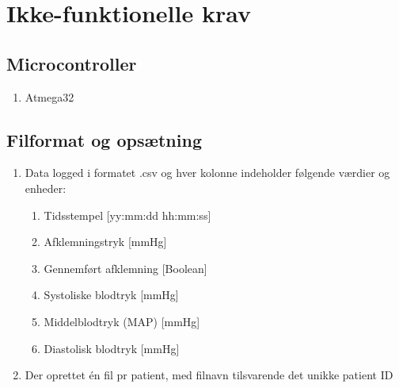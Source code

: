{	%
	
	\pagebreak
	
%	
	
	
	
	
	
	
	
	
	
	
	
	
	
	
	
	\section{Ikke-funktionelle krav }
	
	\subsection{Microcontroller}
	\begin{enumerate}
		\setlength\itemsep{0cm}
		\item Atmega32
		\end{enumerate}
	
	\subsection{Filformat og opsætning}
	\begin{enumerate}
		\setlength\itemsep{0cm} %
		\item Data logged i formatet .csv og hver kolonne indeholder følgende værdier og enheder: 
		\begin{enumerate}
			\item Tidsstempel [yy:mm:dd hh:mm:ss]
			\item Afklemningstryk [mmHg]
			\item Gennemført afklemning [Boolean]
			\item Systoliske blodtryk [mmHg]
			\item Middelblodtryk (MAP) [mmHg]
			\item Diastolisk blodtryk [mmHg]
		\end{enumerate}
		\item Der oprettet én fil pr patient, med filnavn tilsvarende det unikke patient ID
	\end{enumerate}
	
}
